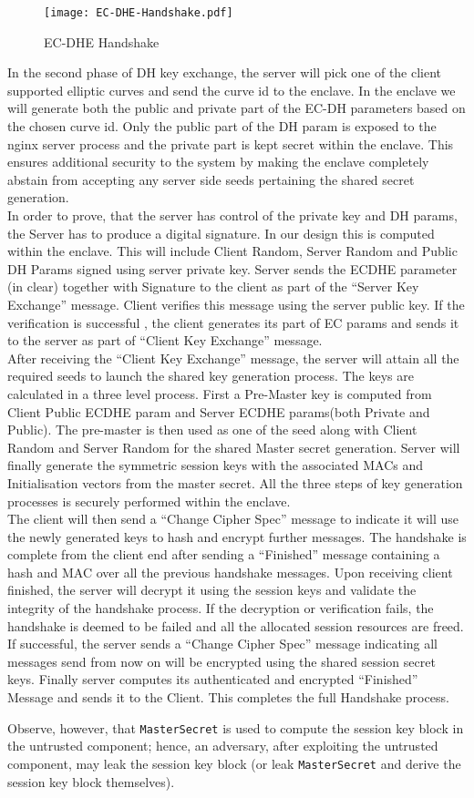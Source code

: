 \documentclass[../../main.tex]{subfiles}
\begin{document}
\begin{figure}[H]
  \centering
  \texttt{[image: EC-DHE-Handshake.pdf]}
  \caption{EC-DHE Handshake}
  \label{fig:ecdhe_handshake}
\end{figure}

\noindent
In the second phase of DH key exchange, the server will pick one of
the client supported elliptic curves and send the curve id to the
enclave. In the enclave we will generate both the public and private
part of the EC-DH parameters based on the chosen curve id. Only the
public part of the DH param is exposed to the nginx server process and
the private part is kept secret within the enclave. This ensures
additional security to the system by making the enclave completely
abstain from accepting any server side seeds pertaining the shared
secret generation.\\

\noindent
In order to prove, that the server has control of the private key and
DH params, the Server has to produce a digital signature. In our
design this is computed within the enclave. This will include Client
Random, Server Random and Public DH Params signed using server private
key. Server sends the ECDHE parameter (in clear) together with
Signature to the client as part of the “Server Key Exchange” message.
Client verifies this message using the server public key. If the
verification is successful , the client generates its part of EC
params and sends it to the server as part of “Client Key Exchange”
message.\\

\noindent
After receiving the “Client Key Exchange” message, the server will
attain all the required seeds to launch the shared key generation
process. The keys are calculated in a three level process. First a
Pre-Master key is computed from Client Public ECDHE param and Server
ECDHE params(both Private and Public). The pre-master is then used as
one of the seed along with Client Random and Server Random for the
shared Master secret generation. Server will finally generate the
symmetric session keys with the associated MACs and Initialisation
vectors from the master secret. All the three steps of key
generation processes is securely performed within the enclave.\\

\noindent
The client will then send a “Change Cipher Spec” message to indicate
it will use the newly generated keys to hash and encrypt further
messages. The handshake is complete from the client end after sending
a “Finished” message containing a hash and MAC over all the previous
handshake messages. Upon receiving client finished, the server will
decrypt it using the session keys and validate the integrity of the
handshake process. If the decryption or verification fails, the
handshake is deemed to be failed and all the allocated session
resources are freed. If successful, the server sends a “Change Cipher
Spec” message indicating all messages send from now on will be
encrypted using the shared session secret keys. Finally server
computes its authenticated and encrypted “Finished” Message and sends
it to the Client. This completes the full Handshake process.

Observe, however, that \texttt{MasterSecret} is used to compute the
session key block in the untrusted component; hence, an adversary,
after exploiting the untrusted component, may leak the session key
block (or leak \texttt{MasterSecret} and derive the session key block
themselves).
\end{document}
